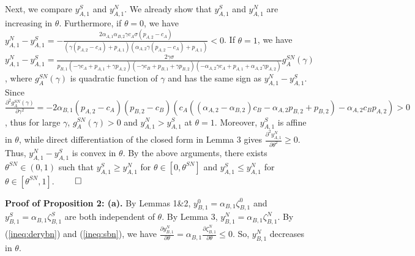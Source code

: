 \documentclass[nonblindrev,copyedit]{informs1}
\begin{document}
\begin{APPENDICES}
Next, we compare $y^S_{A,1}$ and $y^N_{A,1}$.
We already show that $y^S_{A,1}$ and $y^N_{A,1}$ are increasing in $\theta$.
Furthermore, if $\theta = 0$, we have $y^N_{A,1} - y^S_{A,1} = -\frac{2 \alpha_{A,1} \alpha_{B,2} \gamma  c_A \sigma  (p_{A,2}-c_A)}{(\gamma (p_{A,2}-c_A)+p_{A,1}) (\alpha_{A,2} \gamma (p_{A,2}-c_A)+p_{A,1})} < 0$. If $\theta = 1$, we have $y^N_{A,1} - y^S_{A,1} = \frac{2 \gamma \sigma}{p_{B,1} (-\gamma  c_A+p_{A,1}+\gamma  p_{A,2}) (-\gamma  c_B+p_{B,1}+\gamma  p_{B,2}) (-\alpha_{A,2} \gamma  c_A+p_{A,1}+\alpha_{A,2} \gamma  p_{A,2})} g_A^{SN}(\gamma)$, where $g_A^{SN}(\gamma)$ is quadratic function of $\gamma$ and has the same sign as $y^N_{A,1} - y^S_{A,1}$. Since $\frac{\partial^2 g_A^{SN}(\gamma)}{\partial \gamma^2} = -2 \alpha_{B,1}(p_{A,2}-c_A) (p_{B,2}-c_B) (c_A ((\alpha_{A,2}-\alpha_{B,2}) c_B-\alpha_{A,2} p_{B,2}+p_{B,2})-\alpha_{A,2} c_B p_{A,2}) >0$, thus for large $\gamma$, $g_A^{SN}(\gamma) > 0$ and $y^N_{A,1} > y^S_{A,1}$ at $\theta = 1$.
Moreover, $y_{A,1}^S$ is affine in $\theta$, while direct
differentiation of the closed form in Lemma 3 gives $\frac{\partial^2 y_{A,1}^N}{\partial \theta^2}\geq 0$. Thus, $y_{A,1}^N-y_{A,1}^S$ is convex in $\theta$. By the above arguments, there exists $\theta^{SN}\in(0,1)$ such that $y_{A,1}^S\geq y_{A,1}^N$ for $\theta\in[0,\theta^{SN}]$ and $y_{A,1}^S\leq y_{A,1}^N$ for $\theta\in[\theta^{SN},1]$.
$\qed$

{\noindent\bf Proof of Proposition 2: (a).} By Lemmas 1\&2, $y^{0}_{B,1} = \alpha_{B,1} \zeta^0_{B,1}$ and $y^{S}_{B,1} = \alpha_{B,1} \zeta^S_{B,1}$ are both independent of $\theta$.
By Lemma 3, $y^{N}_{B,1} = \alpha_{B,1} \zeta^N_{B,1}$. By (\ref{ineq:derybn}) and (\ref{ineq:sbn}), we have $\frac{\partial y^{N}_{B,1}}{\partial \theta} = \alpha_{B,1} \frac{\partial \zeta^N_{B,1}}{\partial \theta}  \leq 0$. So, $y^{N}_{B,1}$ decreases in $\theta$.


\end{APPENDICES}
\end{document}

